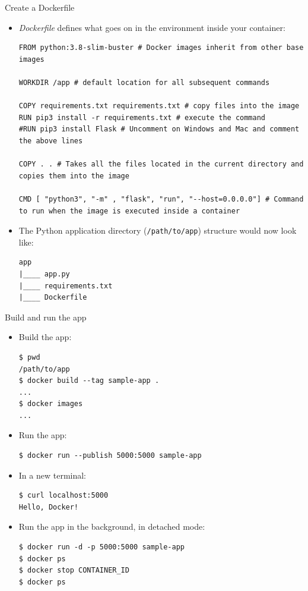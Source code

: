 \begin{frame}[fragile]{Create a Dockerfile}
\begin{itemize}
  \item \textit{Dockerfile} defines what goes on in the environment inside your container:
\begin{lstlisting}[language=syntax]
FROM python:3.8-slim-buster # Docker images inherit from other base images

WORKDIR /app # default location for all subsequent commands

COPY requirements.txt requirements.txt # copy files into the image
RUN pip3 install -r requirements.txt # execute the command
#RUN pip3 install Flask # Uncomment on Windows and Mac and comment the above lines

COPY . . # Takes all the files located in the current directory and copies them into the image

CMD [ "python3", "-m" , "flask", "run", "--host=0.0.0.0"] # Command to run when the image is executed inside a container
\end{lstlisting}

 \item The Python application directory (\texttt{/path/to/app}) structure would now look like:
\begin{lstlisting}
app
|____ app.py
|____ requirements.txt
|____ Dockerfile
\end{lstlisting}
\end{itemize}
\end{frame}

\begin{frame}[fragile]{Build and run the app}
\begin{itemize}
 \item Build the app:
\begin{lstlisting}[language=shell]
$ pwd
/path/to/app
$ docker build --tag sample-app .
...
$ docker images
...
\end{lstlisting}
 \item Run the app:
\begin{lstlisting}[language=shell]
$ docker run --publish 5000:5000 sample-app
\end{lstlisting}

 \item In a new terminal:
\begin{lstlisting}[language=shell]
$ curl localhost:5000
Hello, Docker!
\end{lstlisting}

 \item Run the app in the background, in detached mode:
\begin{lstlisting}[language=shell]
$ docker run -d -p 5000:5000 sample-app
$ docker ps
$ docker stop CONTAINER_ID
$ docker ps
\end{lstlisting}
\end{itemize}
\end{frame}

